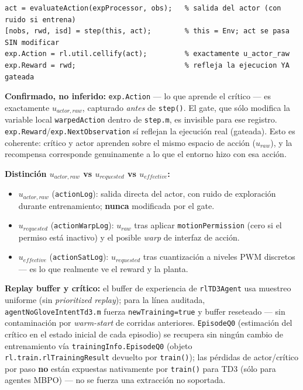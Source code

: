 \documentclass[11pt,a4paper]{article}
\begin{document}
\begin{lstlisting}
act = evaluateAction(expProcessor, obs);   % salida del actor (con ruido si entrena)
[nobs, rwd, isd] = step(this, act);        % this = Env; act se pasa SIN modificar
exp.Action = rl.util.cellify(act);         % exactamente u_actor_raw
exp.Reward = rwd;                          % refleja la ejecucion YA gateada
\end{lstlisting}

\textbf{Confirmado, no inferido:} \texttt{exp.Action} --- lo que aprende el crítico ---
es exactamente $u_{actor,raw}$, capturado \emph{antes} de \texttt{step()}. El gate,
que sólo modifica la variable local \texttt{warpedAction} dentro de \texttt{step.m},
es invisible para ese registro. \texttt{exp.Reward}/\texttt{exp.NextObservation} sí
reflejan la ejecución real (gateada). Esto es coherente: crítico y actor aprenden sobre
el mismo espacio de acción ($u_{raw}$), y la recompensa corresponde genuinamente a lo
que el entorno hizo con esa acción.

\textbf{Distinción \texorpdfstring{$u_{actor,raw}$}{u\_actor\_raw} vs
\texorpdfstring{$u_{requested}$}{u\_requested} vs
\texorpdfstring{$u_{effective}$}{u\_effective}:}
\begin{itemize}
  \item $u_{actor,raw}$ (\texttt{actionLog}): salida directa del actor, con ruido de
    exploración durante entrenamiento; \textbf{nunca} modificada por el gate.
  \item $u_{requested}$ (\texttt{actionWarpLog}): $u_{raw}$ tras aplicar
    \texttt{motionPermission} (cero si el permiso está inactivo) y el posible
    \emph{warp} de interfaz de acción.
  \item $u_{effective}$ (\texttt{actionSatLog}): $u_{requested}$ tras cuantización a
    niveles PWM discretos --- es lo que realmente ve el reward y la planta.
\end{itemize}

\textbf{Replay buffer y crítico:} el buffer de experiencia de \texttt{rlTD3Agent} usa
muestreo uniforme (sin \emph{prioritized replay}); para la línea auditada,
\texttt{agentNoGloveIntentTd3.m} fuerza \texttt{newTraining=true} y buffer reseteado ---
sin contaminación por \emph{warm-start} de corridas anteriores. \texttt{EpisodeQ0}
(estimación del crítico en el estado inicial de cada episodio) se recupera sin ningún
cambio de entrenamiento vía \texttt{trainingInfo.EpisodeQ0} (objeto
\texttt{rl.train.rlTrainingResult} devuelto por \texttt{train()}); las pérdidas de
actor/crítico por paso \textbf{no} están expuestas nativamente por \texttt{train()}
para TD3 (sólo para agentes MBPO) --- no se fuerza una extracción no soportada.
\end{document}
